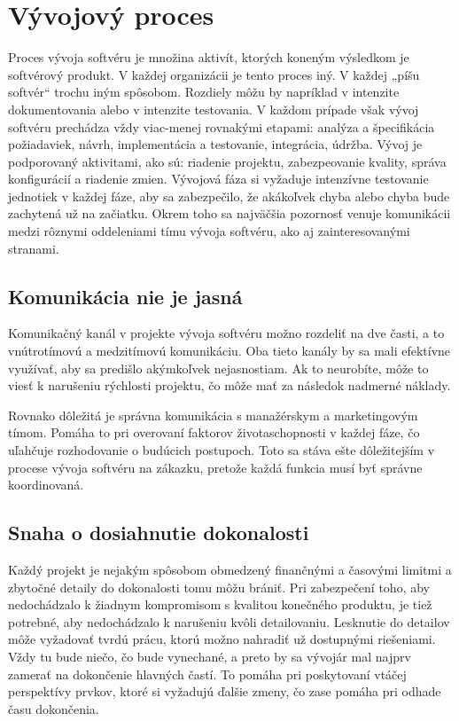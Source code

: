 \documentclass[10pt,twoside,slovak,a4paper]{article}
\begin{document}
\section{Vývojový proces}
Proces vývoja softvéru je množina aktivít, ktorých koneným výsledkom je softvérový
produkt. V každej organizácii je tento proces iný. V každej „píšu softvér“ trochu iným
spôsobom. Rozdiely môžu by napríklad v intenzite dokumentovania alebo v intenzite
testovania.
V každom prípade však vývoj softvéru prechádza vždy viac-menej rovnakými etapami:
analýza a špecifikácia požiadaviek, návrh, implementácia a testovanie, integrácia, údržba.
Vývoj je podporovaný aktivitami, ako sú: riadenie projektu, zabezpeovanie kvality, správa
konfigurácií a riadenie zmien.\cite{VyvojProces3}
Vývojová fáza si vyžaduje intenzívne testovanie jednotiek v každej fáze, aby sa zabezpečilo, že akákoľvek chyba alebo chyba bude zachytená už na začiatku. Okrem toho sa najväčšia pozornosť venuje komunikácii medzi rôznymi oddeleniami tímu vývoja softvéru, ako aj zainteresovanými stranami.

\subsection{Komunikácia nie je jasná}
Komunikačný kanál v projekte vývoja softvéru možno rozdeliť na dve časti, a to vnútrotímovú a medzitímovú komunikáciu. Oba tieto kanály by sa mali efektívne využívať, aby sa predišlo akýmkoľvek nejasnostiam. Ak to neurobíte, môže to viesť k narušeniu rýchlosti projektu, čo môže mať za následok nadmerné náklady.

Rovnako dôležitá je správna komunikácia s manažérskym a marketingovým tímom. Pomáha to pri overovaní faktorov životaschopnosti v každej fáze, čo uľahčuje rozhodovanie o budúcich postupoch. Toto sa stáva ešte dôležitejším v procese vývoja softvéru na zákazku, pretože každá funkcia musí byť správne koordinovaná.


\subsection{Snaha o dosiahnutie dokonalosti}
Každý projekt je nejakým spôsobom obmedzený finančnými a časovými limitmi a zbytočné detaily do dokonalosti tomu môžu brániť. Pri zabezpečení toho, aby nedochádzalo k žiadnym kompromisom s kvalitou konečného produktu, je tiež potrebné, aby nedochádzalo k narušeniu kvôli detailovaniu. Lesknutie do detailov môže vyžadovať tvrdú prácu, ktorú možno nahradiť už dostupnými riešeniami. Vždy tu bude niečo, čo bude vynechané, a preto by sa vývojár mal najprv zamerať na dokončenie hlavných častí. To pomáha pri poskytovaní vtáčej perspektívy prvkov, ktoré si vyžadujú ďalšie zmeny, čo zase pomáha pri odhade času dokončenia.
\end{document}
